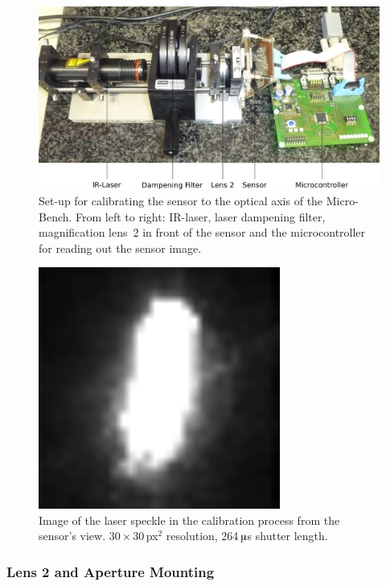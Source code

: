 \documentclass[12pt,a4paper]{article}
\begin{document}
\begin{figure}[htbp]
\begin{center}
\includegraphics[width=1\columnwidth]{figures/cal_setup.pdf}
\caption{\label{fig:cal_setup}
Set-up for calibrating the sensor to the optical axis of the Micro-Bench.
From left to right:
IR-laser,
laser dampening filter,
magnification lens~2 in front of the sensor and the microcontroller for reading out the sensor image.
}
\end{center}
\end{figure}


\begin{figure}[htbp]
\begin{center}
\includegraphics[width=0.4\columnwidth]{figures/sensor_image_laserspot.PNG}
\caption{\label{fig:image-laser}
Image of the laser speckle in the calibration process from the sensor's view.
$30\times30$\,px$^2$ resolution, 264\,$\muup$s shutter length.
}
\end{center}
\end{figure}

\subsubsection{Lens 2 and Aperture Mounting}
\label{l2m}
\end{document}
